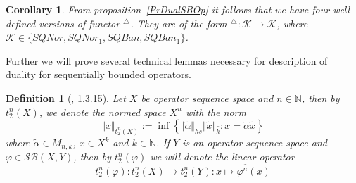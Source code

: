 \documentclass[12pt]{article}
\newtheorem{corollary}[theorem]{Corollary}
\newtheorem{definition}[theorem]{Definition}
\begin{document}
\begin{corollary}\label{CorDualFunc}
From proposition~\ref{PrDualSBOp} it follows that we have four well defined 
versions of functor ${}^\triangle$. They are of the form 
${}^\triangle:\mathcal{K}\to\mathcal{K}$, where 
$\mathcal{K}\in \{SQNor,SQNor_1,SQBan,SQBan_1 \}$. 
\end{corollary}

Further we will prove several technical lemmas necessary for description of 
duality for sequentially bounded operators.

\begin{definition}[\cite{LamOpFolgen}, 1.3.15]\label{DefT2n}
Let $X$ be operator sequence space and $n\in\mathbb{N}$, then by $t_2^n(X)$, we 
denote the normed space $X^n$ with the norm
$$
\Vert x\Vert_{t_2^n(X)}:=\inf\left \{\Vert\tilde{\alpha}\Vert_{hs}\Vert
\tilde{x}\Vert_{\wideparen{k}}:x=\tilde{\alpha} \tilde{x}\right \}
$$
where $\tilde{\alpha}\in M_{n,k}$, $x\in X^k$ and $k\in\mathbb{N}$. If $Y$ is an 
operator sequence space and $\varphi\in\mathcal{SB}(X,Y)$, then by 
$t_2^n(\varphi)$ we will denote the linear operator
$$
t_2^n(\varphi): t_2^n(X)\to t_2^n(Y): x\mapsto \varphi^{\wideparen{n}}(x)
$$
\end{definition}
\end{document}
